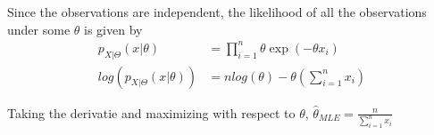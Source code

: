 \documentclass[../../probability-notes.tex]{subfiles}
\begin{document}
        Since the observations are independent, the likelihood of all the observations under some $\theta$ is given by
        \begin{align*}
            p_{X|\Theta}(x|\theta) &= \prod_{i=1}^{n} \theta \exp(-\theta x_{i})\\
            log(p_{X|\Theta}(x|\theta)) &= n log(\theta) - \theta(\sum_{i=1}^{n} x_{i})
        \end{align*}

        Taking the derivatie and maximizing with respect to $\theta$, $\hat{\theta}_{MLE} = \frac{n}{\sum_{i=1}^{n}x_{i}}$
\end{document}
